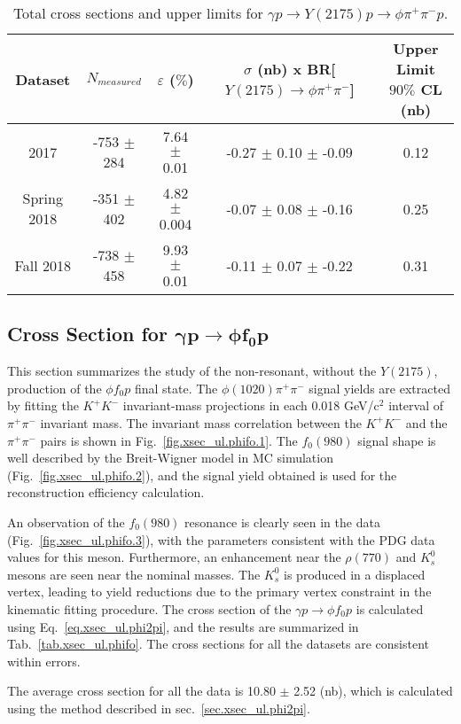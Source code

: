 \begin{table}[!htbp]
    \small
    \centering
    \caption{Total cross sections and upper limits for $\gamma p \rightarrow Y(2175) p \rightarrow \phi \pi^{+} \pi^{-} p$.}
    \label{tab.xsec_ul.yphi2pi.1}
    \begin{tabular}{|c|c|c|c|c|}
        \hline
        Dataset & $N_{measured}$ & $\varepsilon$ ($\%$) & \thead{$\sigma$ (nb) x\\BR[$Y(2175) \rightarrow \phi \pi^{+} \pi^{-}$]} & \thead{Upper Limit\\$90\%$ CL (nb)} \\
        \hline
        2017 & -753 $\pm$ 284 & 7.64 $\pm$ 0.01 & -0.27 $\pm$ 0.10 $\pm$ -0.09 & 0.12 \\
        Spring 2018 & -351 $\pm$ 402 & 4.82 $\pm$ 0.004 & -0.07 $\pm$ 0.08 $\pm$ -0.16 & 0.25 \\
        Fall 2018 & -738 $\pm$ 458 & 9.93 $\pm$ 0.01 & -0.11 $\pm$ 0.07 $\pm$ -0.22 & 0.31 \\
        \hline
    \end{tabular}
\end{table}

\newpage
\subsection{Cross Section for \texorpdfstring{$\bm{\gamma p \rightarrow \phi f_0 p}$}{}}
\label{sec.xsec_ul.phifo}

This section summarizes the study of the non-resonant, without the $Y(2175)$, production of the $\phi f_0 p$ final state. The $\phi(1020)\pi^{+}\pi^{-}$ signal yields are extracted by fitting the $K^{+}K^{-}$ invariant-mass projections in each 0.018 GeV/c$^{2}$ interval of $\pi^{+}\pi^{-}$ invariant mass. The invariant mass correlation between the $K^{+}K^{-}$ and the $\pi^{+}\pi^{-}$ pairs is shown in Fig.~\ref{fig.xsec_ul.phifo.1}. The $f_{0}(980)$ signal shape is well described by the Breit-Wigner model in MC simulation (Fig.~\ref{fig.xsec_ul.phifo.2}), and the signal yield obtained is used for the reconstruction efficiency calculation.
~\par An observation of the $f_{0}(980)$ resonance is clearly seen in the data (Fig.~\ref{fig.xsec_ul.phifo.3}), with the parameters consistent with the PDG data values for this meson. Furthermore, an enhancement near the $\rho(770)$ and $K_{s}^{0}$ mesons are seen near the nominal masses. The $K_{s}^{0}$ is produced in a displaced vertex, leading to yield reductions due to the primary vertex constraint in the kinematic fitting procedure. The cross section of the $\gamma p \rightarrow \phi f_0 p$ is calculated using Eq.~\ref{eq.xsec_ul.phi2pi}, and the results are summarized in Tab.~\ref{tab.xsec_ul.phifo}. The cross sections for all the datasets are consistent within errors.
~\par The average cross section for all the data is 10.80 $\pm$ 2.52 (nb), which is calculated using the method described in sec.~\ref{sec.xsec_ul.phi2pi}.

